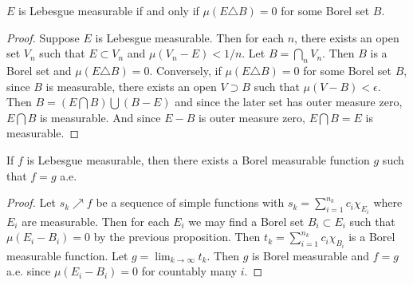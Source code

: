 \begin{proposition}
    $E$ is Lebesgue measurable if and only if $\mu(E\triangle B)=0$ for some 
    Borel set $B$.
\end{proposition}
\begin{proof}
    Suppose $E$ is Lebesgue measurable. Then for each $n$, there exists
    an open set $V_n$ such that $E\subset V_n$ and $\mu(V_n-E)<1/n$. 
    Let $B = \bigcap_n V_n$. Then $B$ is a Borel set and $\mu(E\triangle B) = 0$. 
    Conversely, if $\mu(E\triangle B) = 0$ for some Borel set $B$, 
    since $B$ is measurable, there exists an open $V\supset B$ such that 
    $\mu(V-B)<\epsilon$. Then $B = (E\bigcap B) \bigcup (B-E)$ and since the 
    later set has outer measure zero, $E\bigcap B$ is measurable. And since 
    $E-B$ is outer measure zero, $E\bigcap B = E$ is measurable.
\end{proof}

\begin{proposition}
    If $f$ is Lebesgue measurable, then there exists a Borel measurable 
    function $g$ such that $f=g$ a.e.
\end{proposition}
\begin{proof}
    Let $s_k\nearrow f$ be a sequence of simple functions with 
    $s_k = \sum_{i=1}^{n_k}c_i\chi_{E_i}$ where $E_i$ are measurable. 
    Then for each $E_i$ we may find a Borel set $B_i\subset E_i$ 
    such that $\mu(E_i-B_i) = 0$ by the previous proposition. 
    Then $t_k = \sum_{i=1}^{n_k}c_i\chi_{B_i}$ is a Borel measurable 
    function. Let $g = \lim_{k\to\infty} t_k$. Then $g$ is Borel measurable 
    and $f=g$ a.e. since $\mu(E_i-B_i)=0$ for countably many $i$.
\end{proof}